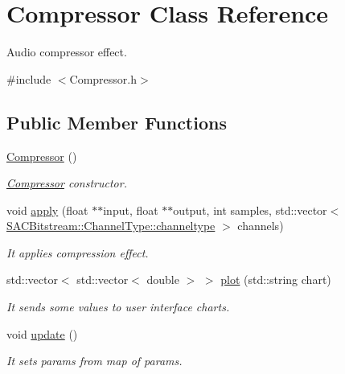 \hypertarget{class_compressor}{}\section{Compressor Class Reference}
\label{class_compressor}


Audio compressor effect.  




{\ttfamily \#include $<$Compressor.\+h$>$}

\subsection*{Public Member Functions}
\begin{DoxyCompactItemize}
\item 
\mbox{\label{class_compressor_a8a728ed1544cc0f82e8390f4606026b0}} 
\hyperlink{class_compressor_a8a728ed1544cc0f82e8390f4606026b0}{Compressor} ()
\begin{DoxyCompactList}\small\item\em \hyperlink{class_compressor}{Compressor} constructor. \end{DoxyCompactList}\item 
void \hyperlink{class_compressor_a2937588c4c8ff8cb3781444663f392e9}{apply} (float $\ast$$\ast$input, float $\ast$$\ast$output, int samples, std\+::vector$<$ \hyperlink{struct_s_a_c_bitstream_1_1_channel_type_a31c32b34085c06a1c58d920ca28c17c9}{S\+A\+C\+Bitstream\+::\+Channel\+Type\+::channeltype} $>$ channels)
\begin{DoxyCompactList}\small\item\em It applies compression effect. \end{DoxyCompactList}\item 
std\+::vector$<$ std\+::vector$<$ double $>$ $>$ \hyperlink{class_compressor_a57e231b206c612382a6cf4c348868838}{plot} (std\+::string chart)
\begin{DoxyCompactList}\small\item\em It sends some values to user interface charts. \end{DoxyCompactList}\item 
\mbox{\label{class_compressor_adabaa093dd4341c70f1388bbfbd0693a}} 
void \hyperlink{class_compressor_adabaa093dd4341c70f1388bbfbd0693a}{update} ()
\begin{DoxyCompactList}\small\item\em It sets params from map of params. \end{DoxyCompactList}\end{DoxyCompactItemize}


